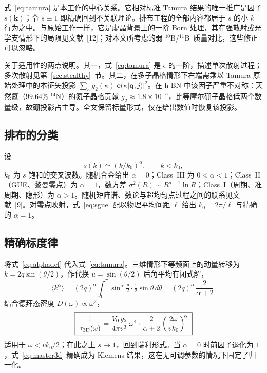\documentclass[10pt,twocolumn]{article}
\newcommand{\tenB}{$^{10}$B}
\newcommand{\elevenB}{$^{11}$B}
\newcommand{\kzero}{k_{0}}
\begin{document}
式~\eqref{eq:tamura} 是本工作的中心关系。它相对标准 Tamura 结果的唯一推广是因子 $s(\bm k)$；令 $s\equiv1$ 即精确回到不关联理论。排布工程的全部内容都居于 $s$ 的小 $k$ 行为之中。与原始工作一样，它是虚晶背景上的一阶 Born 处理，其在强散射或光学支情形下的局限见文献~[12]；对本文所考虑的弱 \tenB/\elevenB\ 质量对比，这些修正可以忽略。

关于适用性的两点说明。其一，式~\eqref{eq:tamura} 是 $\epsilon$ 的一阶，描述单次散射过程；多次散射见第~\ref{sec:stealthy}~节。其二，在多子晶格情形下右端需乘以 Tamura 原始处理中的本征矢投影 $\sum_\kappa g_2(\kappa)|\bm e(\kappa|\bm q,j)|^{2}$。在 h-BN 中该因子严重不对称：天然氮（$99.64\%$ $^{14}$N）的氮子晶格贡献 $g_2\approx1.8\times10^{-5}$，比等摩尔硼子晶格低两个数量级，故硼投影占主导。全文保留标量形式，仅在给出数值时恢复该投影。

\subsection{排布的分类}

设
\begin{equation}
  s(k)\simeq(k/\kzero)^{\alpha},\qquad k<\kzero,
  \label{eq:alphadef}
\end{equation}
$\kzero$ 为 $s$ 饱和的交叉波数。随机合金给出 $\alpha=0$；Class~III 为 $0<\alpha<1$；Class~II（GUE、黎曼零点）为 $\alpha=1$，数方差 $\sigma^{2}(R)\sim R^{d-1}\ln R$；Class~I（周期、准周期、隐形）为 $\alpha>1$。随机矩阵谱、数论与超均匀点过程之间的联系见文献~[9]。对零点映射，式~\eqref{eq:sgue} 配以物理平均间距 $\ell$ 给出 $\kzero=2\pi/\ell$ 与精确的 $\alpha=1$。

\subsection{精确标度律}
\label{sec:scaling}

将式~\eqref{eq:alphadef} 代入式~\eqref{eq:tamura}。三维情形下等频面上的动量转移为 $k=2q\sin(\theta/2)$，作代换 $u=\sin(\theta/2)$ 后角平均有闭式解，
\begin{equation}
  \big\langle k^{\alpha}\big\rangle
    = (2q)^{\alpha}\!\!\int_0^{\pi}\!\!\sin^{\alpha}\!\tfrac{\theta}{2}
      \cdot\tfrac{1}{2}\sin\theta\,d\theta
    = (2q)^{\alpha}\,\frac{2}{\alpha+2}.
  \label{eq:angavg}
\end{equation}
结合德拜态密度 $D(\omega)\propto\omega^{2}$，
\begin{equation}
  \boxed{\;
  \frac{1}{\tau_{\rm 3D}(\omega)}
    = \frac{V_0\,g_2}{4\pi v^{3}}\,\omega^{4}\cdot\frac{2}{\alpha+2}
      \left(\frac{2\omega}{v\kzero}\right)^{\!\alpha}\;}
  \label{eq:master3d}
\end{equation}
适用于 $\omega<v\kzero/2$；在此之上 $s\to1$，回到瑞利形式。当 $\alpha=0$ 时前因子退化为 $1$，式~\eqref{eq:master3d} 精确成为 Klemens 结果，这在无可调参数的情况下固定了归一化。
\end{document}
